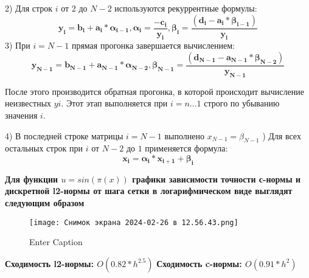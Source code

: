 \documentclass{beamer}
\begin{document}
\begin{frame}
2) Для строк $i$ от $2$ до $N-2$ используются рекуррентные формулы:
\[\mathbf{y_i=b_i+a_i*\alpha_{i-1}, \alpha_i=\frac{-c_i}{y_i}, \beta_i=\frac{(d_i-a_i*\beta_{i-1})}{y_i}}\]
3) При $i = N - 1$ прямая прогонка завершается вычислением: 
\[\mathbf{y_{N-1}=b_{N-1}+a_{N-1}*\alpha_{N-2}, \beta_{N-1}=\frac{(d_{N-1}-a_{N-1}*\beta_{N-2})}{y_{N-1}}}\]

После этого производится обратная прогонка, в которой происходит вычисление неизвестных $yi$. Этот этап выполняется при $i = n...1$ строго по
убыванию значения $i$.

4) В последней строке матрицы $i = N - 1$ выполнено $x_{N-1} = \beta_{N-1}$
) Для всех остальных строк при $i$ от $N-2$ до $1$ применяется формула:
\[\mathbf{x_i=\alpha_i*x_{i+1}+\beta_{i}}\]
\end{frame}

\begin{frame}
\textbf{Для функции $u=sin(\pi(x))$ графики зависимости точности с-нормы и дискретной l2-нормы от шага сетки в логарифмическом виде выглядят следующим образом}

\begin{figure}
    \centering
    \texttt{[image: Снимок экрана 2024-02-26 в 12.56.43.png]}
    \caption{Enter Caption}
    \label{fig:enter-label}
\end{figure}

\end{frame}

\begin{frame}
\textbf{Сходимость l2-нормы: $O(0.82 * h^{2.5})$}    
\newline
\textbf{Сходимость c-нормы: $O(0.91* h^{2})$}    
\end{frame}
\end{document}

